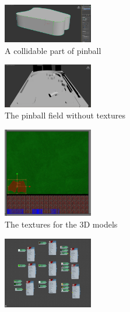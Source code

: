 \documentclass[11.5pt,oneside,a4paper]{scrartcl}
\begin{document}
\begin{figure}
	\centering
	\includegraphics[width=0.35\textwidth]{3dmodel.jpg}
	\caption{A collidable part of pinball}
	\label{fig:3dmodel}
	\vspace{0.6cm}
\end{figure}

\begin{figure}
	\centering
	\includegraphics[width=0.35\textwidth]{pinballwithouttextures.jpg}
	\caption{The pinball field without textures}
	\label{fig:pinballwithouttextures}
	\vspace{0.6cm}
\end{figure}

\begin{figure}
	\centering
	\includegraphics[width=0.35\textwidth]{texturesfor3dmodel.jpg}
	\caption{The textures for the 3D models}
	\label{fig:texturesfor3dmodel}
	\vspace{0.6cm}
\end{figure}

\begin{figure}
	\centering
	\includegraphics[width=0.35\textwidth]{texturing.jpg}
	\caption{}
	\label{fig:texturing}
	\vspace{0.6cm}
\end{figure}
\end{document}
